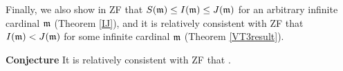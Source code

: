 Finally, we also show in ZF that $S(\frak{m}) \leq I(\frak{m}) \leq J(\frak{m})$ for an arbitrary infinite cardinal $\frak{m}$ (Theorem \ref{IJ}), and it is relatively consistent with ZF that $I(\frak{m}) < J(\frak{m})$ for some infinite cardinal $\frak{m}$ (Theorem \ref{VT3result}). 

\noindent\textbf{Conjecture}
    It is relatively consistent with \textup{ZF} that .
